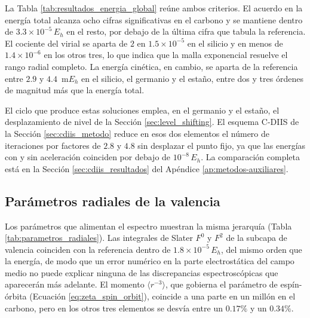 La Tabla \ref{tab:resultados_energia_global} reúne ambos criterios. El acuerdo en la energía total alcanza ocho cifras significativas en el carbono y se mantiene dentro de $3.3\times10^{-5}\,E_h$ en el resto, por debajo de la última cifra que tabula la referencia. El cociente del virial se aparta de $2$ en $1.5\times10^{-5}$ en el silicio y en menos de $1.4\times10^{-6}$ en los otros tres, lo que indica que la malla exponencial resuelve el rango radial completo. La energía cinética, en cambio, se aparta de la referencia entre $2.9$ y $4.4$~m$E_h$ en el silicio, el germanio y el estaño, entre dos y tres órdenes de magnitud más que la energía total.

El ciclo que produce estas soluciones emplea, en el germanio y el estaño, el desplazamiento de nivel de la Sección \ref{sec:level_shifting}. El esquema C-DIIS de la Sección \ref{sec:cdiis_metodo} reduce en esos dos elementos el número de iteraciones por factores de $2.8$ y $4.8$ sin desplazar el punto fijo, ya que las energías con y sin aceleración coinciden por debajo de $10^{-8}\,E_h$. La comparación completa está en la Sección \ref{sec:cdiis_resultados} del Apéndice \ref{ap:metodos-auxiliares}.

\subsection{Parámetros radiales de la valencia}
\label{sec:parametros_fina}

Los parámetros que alimentan el espectro muestran la misma jerarquía (Tabla \ref{tab:parametros_radiales}). Las integrales de Slater $F^0$ y $F^2$ de la subcapa de valencia coinciden con la referencia dentro de $1.8\times10^{-5}\,E_h$, del mismo orden que la energía, de modo que un error numérico en la parte electrostática del campo medio no puede explicar ninguna de las discrepancias espectroscópicas que aparecerán más adelante. El momento $\langle r^{-3}\rangle$, que gobierna el parámetro de espín-órbita (Ecuación \eqref{eq:zeta_spin_orbit}), coincide a una parte en un millón en el carbono, pero en los otros tres elementos se desvía entre un $0.17\%$ y un $0.34\%$.

\begin{table}[htbp]
    \centering
    
    \caption[Integrales de Slater y momento $\langle r^{-3}\rangle$ de valencia]{Integrales de Slater y momento $\langle r^{-3}\rangle$ del orbital de valencia frente a los valores de \textcite{fischer1977}, en las unidades atómicas de energía ($E_h$) y de longitud ($a_0$) del Apéndice \ref{ap:unidades-atomicas}.}
    \label{tab:parametros_radiales}
\end{table}

